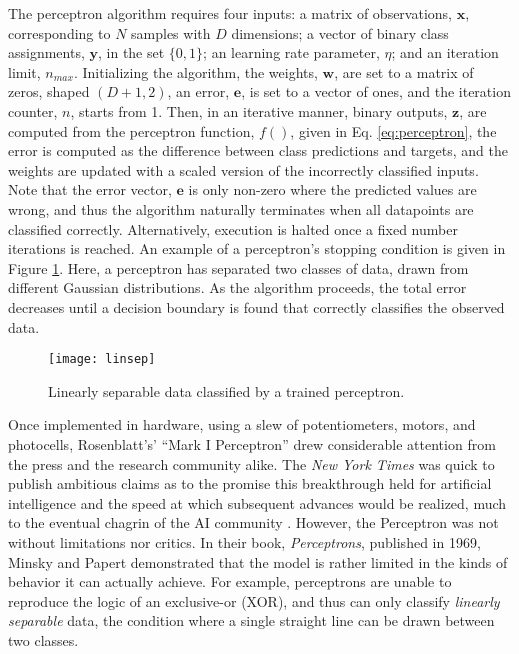 \noindent The perceptron algorithm requires four inputs:
a matrix of observations, $\mathbf{x}$, corresponding to $N$ samples with $D$ dimensions;
a vector of binary class assignments, $\mathbf{y}$, in the set $\{0, 1\}$;
an learning rate parameter, $\eta$;
and an iteration limit, $n_{max}$.
Initializing the algorithm, the weights, $\mathbf{w}$, are set to a matrix of zeros, shaped $(D + 1, 2)$, an error, $\mathbf{e}$, is set to a vector of ones, and the iteration counter, $n$, starts from 1.
Then, in an iterative manner, binary outputs, $\mathbf{z}$, are computed from the perceptron function, $f()$, given in Eq. \ref{eq:perceptron}, the error is computed as the difference between class predictions and targets, and the weights are updated with a scaled version of the incorrectly classified inputs.
Note that the error vector, $\mathbf{e}$ is only non-zero where the predicted values are wrong, and thus the algorithm naturally terminates when all datapoints are classified correctly.
Alternatively, execution is halted once a fixed number iterations is reached.
An example of a perceptron's stopping condition is given in Figure \ref{fig:linsep}.
Here, a perceptron has separated two classes of data, drawn from different Gaussian distributions.
As the algorithm proceeds, the total error decreases until a decision boundary is found that correctly classifies the observed data.

\begin{figure}
\begin{centering}
\texttt{[image: linsep]}
\caption{Linearly separable data classified by a trained perceptron.}
\label{fig:linsep}
\end{centering}
\end{figure}

Once implemented in hardware, using a slew of potentiometers, motors, and photocells, Rosenblatt's' ``Mark I Perceptron'' drew considerable attention from the press and the research community alike.
The \emph{New York Times} was quick to publish ambitious claims as to the promise this breakthrough held for artificial intelligence and the speed at which subsequent advances would be realized, much to the eventual chagrin of the AI community \cite{somebody}.
However, the Perceptron was not without limitations nor critics.
In their book, \emph{Perceptrons}, published in 1969, Minsky and Papert demonstrated that the model is rather limited in the kinds of behavior it can actually achieve.
For example, perceptrons are unable to reproduce the logic of an exclusive-or (XOR), and thus can only classify \emph{linearly separable} data, the condition where a single straight line can be drawn between two classes.

